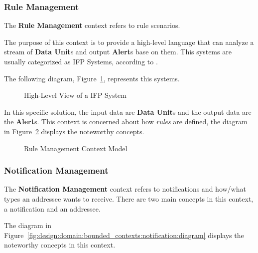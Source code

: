 \subsubsection*{Rule Management}
\label{subsubsec:design:domain:bounded_contexts:rule}

The \textbf{Rule Management} context refers to rule scenarios.

The purpose of this context is to provide a high-level language that can analyze a stream of \textbf{Data Unit}s and output \textbf{Alert}s base on them. This systems are usually categorized as \gls{IFP} Systems, according to \cite{cugola2012processing}.

The following diagram, Figure~\ref{fig:design:domain:bounded_contexts:rule:ifp}, represents this systems.

\begin{figure}[H]
   \centering
  \resizebox{\columnwidth}{!}
  {
     
  }
  \caption[High-Level View of a \gls{IFP} System]{High-Level View of a \gls{IFP} System}
  \label{fig:design:domain:bounded_contexts:rule:ifp}
\end{figure}

In this specific solution, the input data are \textbf{Data Unit}s and the output data are the \textbf{Alert}s. This context is concerned about how \textit{rules} are defined, the diagram in Figure~\ref{fig:design:domain:bounded_contexts:rule:diagram} displays the noteworthy concepts.

\begin{figure}[H]
   \centering
  \resizebox{\columnwidth}{!}
  {
     
  }
  \caption[Rule Management Context Model]{Rule Management Context Model}
  \label{fig:design:domain:bounded_contexts:rule:diagram}
\end{figure}

\subsubsection*{Notification Management}
\label{subsubsec:design:domain:bounded_contexts:notification}

The \textbf{Notification Management} context refers to notifications and how/what types an addressee wants to receive. There are two main concepts in this context, a notification and an addressee.

The diagram in Figure~\ref{fig:design:domain:bounded_contexts:notification:diagram} displays the noteworthy concepts in this context.

